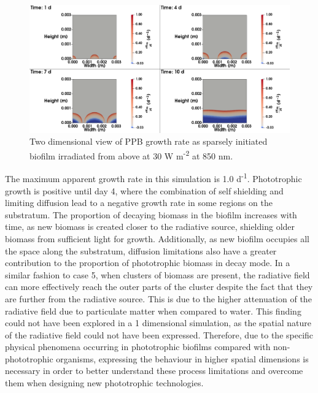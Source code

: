 \begin{figure}[H]
    \centering
    \hspace*{-1cm}\includegraphics[width=1.1\textwidth,height=0.4\textheight]{Chap4/methods/data/figures/case6_growth_frac.png}
    \caption{Two dimensional view of PPB growth rate as sparsely initiated biofilm irradiated from above at 30 W m\textsuperscript{-2} at 850 nm.} 
    \label{fig:case6_growth_frac}
\end{figure}
The maximum apparent growth rate in this simulation is 1.0 d\textsuperscript{-1}. Phototrophic growth is positive until day 4, where the combination of self shielding and limiting diffusion lead to a negative growth rate in some regions on the substratum. The proportion of decaying biomass in the biofilm increases with time, as new biomass is created closer to the radiative source, shielding older biomass from sufficient light for growth. Additionally, as new biofilm occupies all the space along the substratum, diffusion limitations also have a greater contribution to the proportion of phototrophic biomass in decay mode. In a similar fashion to case 5, when clusters of biomass are present, the radiative field can more effectively reach the outer parts of the cluster despite the fact that they are further from the radiative source. This is due to the higher attenuation of the radiative field due to particulate matter when compared to water. This finding could not have been explored in a 1 dimensional simulation, as the spatial nature of the radiative field could not have been expressed. Therefore, due to the specific physical phenomena occurring in phototrophic biofilms compared with non-phototrophic organisms, expressing the behaviour in higher spatial dimensions is necessary in order to better understand these process limitations and overcome them when designing new phototrophic technologies.





